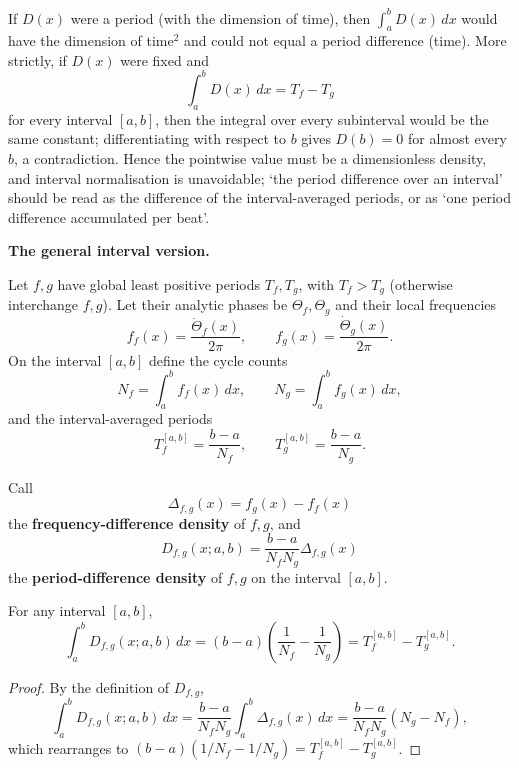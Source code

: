 \begin{remark}
\label{rem:dyn_period_density_no_go}
If \(D(x)\) were a period (with the dimension of time), then \(\int_a^b D(x)\,dx\) would have the dimension of time\(^2\) and could not equal a period difference (time). More strictly, if \(D(x)\) were fixed and
\[
\int_a^b D(x)\,dx=T_f-T_g
\]
for every interval \([a,b]\), then the integral over every subinterval would be the same constant; differentiating with respect to \(b\) gives \(D(b)=0\) for almost every \(b\), a contradiction. Hence the pointwise value must be a dimensionless density, and interval normalisation is unavoidable; `the period difference over an interval' should be read as the difference of the interval-averaged periods, or as `one period difference accumulated per beat'.
\end{remark}

\textbf{The general interval version.}

Let \(f,g\) have global least positive periods \(T_f,T_g\), with \(T_f>T_g\) (otherwise interchange \(f,g\)). Let their analytic phases be \(\Theta_f,\Theta_g\) and their local frequencies
\[
f_f(x)=\frac{\dot\Theta_f(x)}{2\pi},\qquad
f_g(x)=\frac{\dot\Theta_g(x)}{2\pi}.
\]
On the interval \([a,b]\) define the cycle counts
\[
N_f=\int_a^b f_f(x)\,dx,\qquad
N_g=\int_a^b f_g(x)\,dx,
\]
and the interval-averaged periods
\[
T_f^{[a,b]}=\frac{b-a}{N_f},\qquad
T_g^{[a,b]}=\frac{b-a}{N_g}.
\]

\begin{definition}
\label{def:dyn_period_difference_density}
Call
\[
\Delta_{f,g}(x)=f_g(x)-f_f(x)
\]
the \textbf{frequency-difference density} of \(f,g\), and
\[
D_{f,g}(x;a,b)=\frac{b-a}{N_fN_g}\Delta_{f,g}(x)
\]
the \textbf{period-difference density} of \(f,g\) on the interval \([a,b]\).
\end{definition}

\begin{proposition}
\label{prop:dyn_period_difference_integral}
For any interval \([a,b]\),
\[
\int_a^b D_{f,g}(x;a,b)\,dx
=(b-a)\left(\frac1{N_f}-\frac1{N_g}\right)
=T_f^{[a,b]}-T_g^{[a,b]}.
\]
\end{proposition}

\begin{proof}
By the definition of \(D_{f,g}\),
\[
\int_a^b D_{f,g}(x;a,b)\,dx
=\frac{b-a}{N_fN_g}\int_a^b\Delta_{f,g}(x)\,dx
=\frac{b-a}{N_fN_g}(N_g-N_f),
\]
which rearranges to \((b-a)(1/N_f-1/N_g)=T_f^{[a,b]}-T_g^{[a,b]}\).
\end{proof}


